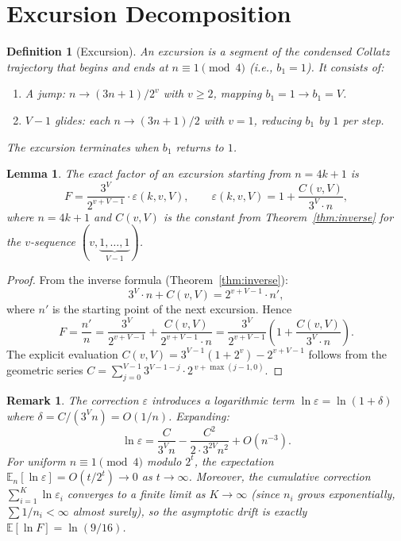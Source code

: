 \documentclass[12pt,a4paper]{article}
\newtheorem{lemma}[theorem]{Lemma}
\newtheorem{definition}[theorem]{Definition}
\newtheorem{remark}[theorem]{Remark}
\newcommand{\E}{\mathbb{E}}
\begin{document}
\section{Excursion Decomposition}\label{sec:excursion}

\begin{definition}[Excursion]\label{def:excursion}
An \emph{excursion} is a segment of the condensed Collatz trajectory that begins and ends at $n \equiv 1 \pmod 4$ (i.e., $b_1 = 1$). It consists of:
\begin{enumerate}
\item A \emph{jump}: $n \to (3n+1)/2^{v}$ with $v \ge 2$, mapping $b_1 = 1 \to b_1 = V$.
\item $V-1$ \emph{glides}: each $n \to (3n+1)/2$ with $v = 1$, reducing $b_1$ by $1$ per step.
\end{enumerate}
The excursion terminates when $b_1$ returns to $1$.
\end{definition}

\begin{lemma}\label{lem:excursion_factor}
The exact factor of an excursion starting from $n = 4k+1$ is
\[
F = \frac{3^V}{2^{v+V-1}} \cdot \varepsilon(k,v,V),
\qquad
\varepsilon(k,v,V) = 1 + \frac{C(v,V)}{3^V \cdot n},
\]
where $n = 4k+1$ and $C(v,V)$ is the constant from Theorem~\ref{thm:inverse} for the $v$-sequence $(v,\underbrace{1,\ldots,1}_{V-1})$.
\end{lemma}

\begin{proof}
From the inverse formula (Theorem~\ref{thm:inverse}):
\[
3^V \cdot n + C(v,V) = 2^{v+V-1} \cdot n',
\]
where $n'$ is the starting point of the next excursion. Hence
\[
F = \frac{n'}{n} = \frac{3^V}{2^{v+V-1}} + \frac{C(v,V)}{2^{v+V-1} \cdot n}
= \frac{3^V}{2^{v+V-1}} \left(1 + \frac{C(v,V)}{3^V \cdot n}\right).
\]
The explicit evaluation $C(v,V) = 3^{V-1}(1+2^v) - 2^{v+V-1}$ follows from the geometric series $C = \sum_{j=0}^{V-1} 3^{V-1-j} \cdot 2^{\,v+\max(j-1,0)}$.
\end{proof}

\begin{remark}\label{rem:epsilon}
The correction $\varepsilon$ introduces a logarithmic term $\ln\varepsilon = \ln(1 + \delta)$ where $\delta = C/(3^V n) = O(1/n)$. Expanding:
\[
\ln\varepsilon = \frac{C}{3^V n} - \frac{C^2}{2\cdot 3^{2V} n^2} + O(n^{-3}).
\]
For uniform $n \equiv 1 \pmod 4$ modulo $2^t$, the expectation $\E_n[\ln\varepsilon] = O(t/2^t) \to 0$ as $t \to \infty$. Moreover, the cumulative correction $\sum_{i=1}^K \ln\varepsilon_i$ converges to a finite limit as $K \to \infty$ (since $n_i$ grows exponentially, $\sum 1/n_i < \infty$ almost surely), so the asymptotic drift is exactly $\E[\ln F] = \ln(9/16)$.
\end{remark}
\end{document}
